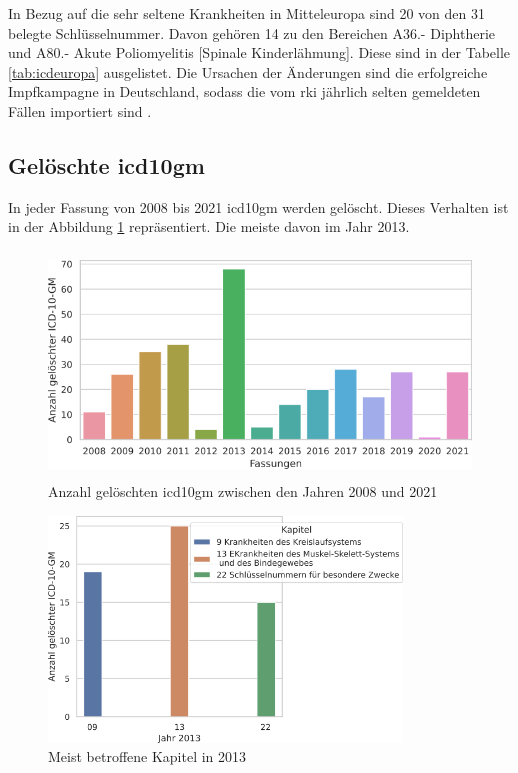 In Bezug auf die sehr seltene Krankheiten in Mitteleuropa sind \textsf{20} von den \textsf{31} belegte Schlüsselnummer. Davon gehören \textsf{14} zu den Bereichen \textsf{A36.-} \textsf{Diphtherie} und \textsf{A80.-} \textsf{Akute Poliomyelitis [Spinale Kinderlähmung]}. Diese sind in der Tabelle \ref{tab:icdeuropa} ausgelistet. Die Ursachen der Änderungen sind die erfolgreiche Impfkampagne in Deutschland, sodass die vom \ac{rki} jährlich selten gemeldeten Fällen importiert sind \cite{dippol1}.

\subsection{Gelöschte \acs{icd10gm}}

In jeder Fassung von 2008 bis 2021 \ac{icd10gm} werden gelöscht. Dieses Verhalten ist in der Abbildung \ref{fig:newdeleteoldicdyear} repräsentiert. Die meiste davon im Jahr 2013. 

\clearpage

\begin{figure}[ht]
	\centering
	\includegraphics[height=6cm]{figures/neuVersionDelete}
	\caption[Gelöschte \acs{icd10gm} pro Jahr]{Anzahl gelöschten \acs{icd10gm} zwischen den Jahren 2008 und 2021}
	\label{fig:newdeleteoldicdyear}
\end{figure} 


\begin{figure}[ht]
	\centering
	\includegraphics[height=6cm]{figures/kaptnr13}
	\caption{Meist betroffene Kapitel in 2013}
	\label{fig:kap13}
\end{figure}

